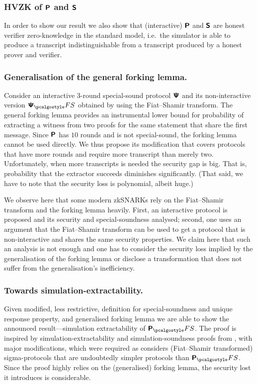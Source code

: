 \let\accentvec\vec \documentclass[runningheads,10pt]{llncs}
\begin{document}
\subsubsection{HVZK of $\bm{\mathsf{P}}$ and $\bm{\mathsf{S}}$}%
\label{ssub:hvzk_of_plonkprot_and_sonicprot_}
In order to show our result we also show that (interactive) $\bm{\mathsf{P}}$ and
$\bm{\mathsf{S}}$ are
honest verifier zero-knowledge in the standard model, i.e.~the simulator is
able to produce a transcript indistinguishable from a transcript produced by a
honest prover and verifier.

\subsubsection{Generalisation of the general forking lemma.}
Consider an interactive $3$-round special-sound protocol $\bm{\mathsf{\Psi}}$ and its
non-interactive version $\ps_\fs$ obtained by using the Fiat--Shamir transform.
The general forking lemma provides an instrumental lower bound for probability
of extracting a witness from two proofs for the same statement that share the
first message.  Since $\bm{\mathsf{P}}$ has $10$ rounds and is not special-sound, the
forking lemma cannot be used directly. We thus propose its modification that
covers protocols that have more rounds and require more transcript than merely
two. 
Unfortunately, when more transcripts is needed the security gap is big. That is,
probability that the extractor succeeds diminishes significantly. (That said, we
have to note that the security loss is polynomial, albeit huge.)

We observe here that some modern zkSNARKs rely on the Fiat--Shamir transform and
the forking lemma heavily. First, an interactive protocol is proposed and its
security and special-soundness analysed; second, one uses an argument that the
Fiat--Shamir transform can be used to get a protocol that is non-interactive and
shares the same security properties.  We claim here that such an analysis is not
enough and one has to consider the security loss implied by the generalisation
of the forking lemma or disclose a transformation that does not suffer from the
generalisation's inefficiency.

\subsubsection{Towards simulation-extractability.} Given modified, less
restrictive, definition for special-soundness and unique response property, and
generalised forking lemma we are able to show the announced result---simulation
extractability of $\plonkprot_\fs$. The proof is inspired by
simulation-extractability and simulation-soundness proofs from
\cite{INDOCRYPT:FKMV12}, with major modifications, which were required as
\cite{INDOCRYPT:FKMV12} considers (Fiat--Shamir transformed) sigma-protocols
that are undoubtedly simpler protocols than $\plonkprot_\fs$.  Since the proof
highly relies on the (generalised) forking lemma, the security lost it
introduces is considerable.
\end{document}
